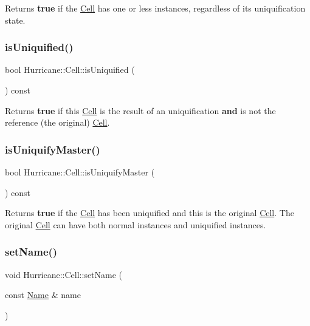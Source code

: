 Returns {\bfseries true} if the \mbox{\hyperlink{classHurricane_1_1Cell}{Cell}} has one or less instances, regardless of it\textquotesingle{}s uniquification state. \mbox{\label{classHurricane_1_1Cell_a86c21867e9ce896eae72fd2999ce8a2d}} 
\subsubsection{\texorpdfstring{is\+Uniquified()}{isUniquified()}}
{\footnotesize\ttfamily bool Hurricane\+::\+Cell\+::is\+Uniquified (\begin{DoxyParamCaption}{ }\end{DoxyParamCaption}) const}

Returns {\bfseries true} if this \mbox{\hyperlink{classHurricane_1_1Cell}{Cell}} is the result of an uniquification {\bfseries and} is not the reference (the original) \mbox{\hyperlink{classHurricane_1_1Cell}{Cell}}. \mbox{\label{classHurricane_1_1Cell_a0220dbbbe730e6874f7620135e9c10f6}} 
\subsubsection{\texorpdfstring{is\+Uniquify\+Master()}{isUniquifyMaster()}}
{\footnotesize\ttfamily bool Hurricane\+::\+Cell\+::is\+Uniquify\+Master (\begin{DoxyParamCaption}{ }\end{DoxyParamCaption}) const}

Returns {\bfseries true} if the \mbox{\hyperlink{classHurricane_1_1Cell}{Cell}} has been uniquified and this is the original \mbox{\hyperlink{classHurricane_1_1Cell}{Cell}}. The original \mbox{\hyperlink{classHurricane_1_1Cell}{Cell}} can have both normal instances and uniquified instances. \mbox{\label{classHurricane_1_1Cell_ad2c9face922062664110c66ee205eab2}} 
\subsubsection{\texorpdfstring{set\+Name()}{setName()}}
{\footnotesize\ttfamily void Hurricane\+::\+Cell\+::set\+Name (\begin{DoxyParamCaption}\item[{const \mbox{\hyperlink{classHurricane_1_1Name}{Name}} \&}]{name }\end{DoxyParamCaption})}

